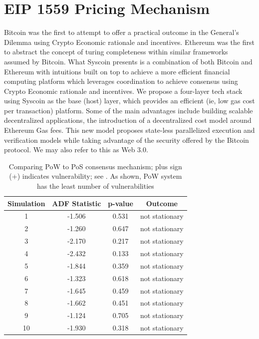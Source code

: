 \documentclass[peerreview]{ieeesyscoin}
\begin{document}
\section{EIP 1559 Pricing Mechanism}
\label{section:eip_1559}

Bitcoin was the first to attempt to offer a practical outcome in the General's Dilemma using Crypto Economic rationale and incentives. Ethereum was the first to abstract the concept of turing completeness within similar frameworks assumed by Bitcoin. What Syscoin presents is a combination of both Bitcoin and Ethereum with intuitions built on top to achieve a more efficient financial computing platform which leverages coordination to achieve consensus using Crypto Economic rationale and incentives. We propose a four-layer tech stack using Syscoin as the base (host) layer, which provides an efficient (ie, low gas cost per transaction) platform. Some of the main advantages include building scalable decentralized applications, the introduction of a decentralized cost model around Ethereum Gas fees. This new model proposes state-less parallelized execution and verification models while taking advantage of the security offered by the Bitcoin protocol. We may also refer to this as Web 3.0.

\begin{table}[h!]
\centering
\begin{tabular}{ |c|c|c|c| } 
\hline
 Simulation & ADF Statistic & p-value & Outcome \\
\hline
1 & -1.506 & 0.531 & not stationary \\
2 & -1.260 & 0.647 & not stationary \\
3 & -2.170 & 0.217 & not stationary \\
4 & -2.432 & 0.133 & not stationary \\
5 & -1.844 & 0.359 & not stationary \\
6 & -1.323 & 0.618 & not stationary \\
7 & -1.645 & 0.459 & not stationary \\
8 & -1.662 & 0.451 & not stationary \\
9 & -1.124 & 0.705 & not stationary \\
10 & -1.930 & 0.318 & not stationary \\
\hline
\end{tabular}
\caption{Comparing PoW to PoS consensus mechanism; plus sign (+) indicates vulnerability; see \cite{Bit15}. As shown, PoW system has the least number of vulnerabilities}
\label{table:pow_vs_pos}
\end{table}
\end{document}
